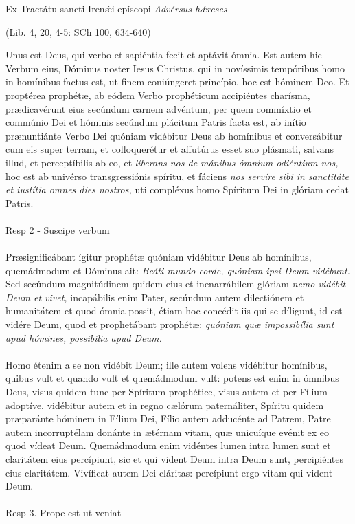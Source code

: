 \documentclass[options]{article}
\begin{document}
	Ex Tractátu sancti Iren\'{æ}i epíscopi \emph{Advérsus h\'{æ}reses}
	\begin{flushright}
			(Lib. 4, 20, 4-5: SCh 100, 634-640)
	\end{flushright}
Unus est Deus, qui verbo et sapiéntia fecit et aptávit ómnia.
Est autem hic Verbum eius, Dóminus noster Iesus Christus, qui in novíssimis tempóribus homo in homínibus factus est, ut finem coniúngeret princípio, hoc est hóminem Deo.
Et proptérea prophétæ, ab eódem Verbo prophéticum accipiéntes charísma, prædicavérunt eius secúndum carnem advéntum, per quem commíxtio et commúnio Dei et hóminis secúndum plácitum Patris facta est, ab inítio prænuntiánte Verbo Dei quóniam vidébitur Deus ab homínibus et conversábitur cum eis super terram, et colloquerétur et affutúrus esset suo plásmati, salvans illud, et perceptíbilis ab eo, et \emph{líberans nos de mánibus ómnium odiéntium nos,} hoc est ab univérso transgressiónis spíritu, et fáciens \emph{nos servíre sibi in sanctitáte et iustítia omnes dies nostros,} uti compléxus homo Spíritum Dei in glóriam cedat Patris.\\
\\
Resp 2 - Suscipe verbum\\
\\
Præsignificábant ígitur prophétæ quóniam vidébitur Deus ab homínibus, quemádmodum et Dóminus ait: \emph{Beáti mundo corde, quóniam ipsi Deum vidébunt.}\\
Sed secúndum magnitúdinem quidem eius et inenarrábilem glóriam \emph{nemo vidébit Deum et vivet,} incapábilis enim Pater, secúndum autem dilectiónem et humanitátem et quod ómnia possit, étiam hoc concédit iis qui se díligunt, id est vidére Deum, quod et prophetábant prophétæ: \emph{quóniam quæ impossibília sunt apud hómines, possibília apud Deum.}\\
\\
Homo étenim a se non vidébit Deum; ille autem volens vidébitur homínibus, quibus vult et quando vult et quemádmodum vult: potens est enim in ómnibus Deus, visus quidem tunc per Spíritum prophétice, visus autem et per Fílium adoptíve, vidébitur autem et in regno cælórum paternáliter, Spíritu quidem præparánte hóminem in Fílium Dei, Fílio autem adducénte ad Patrem, Patre autem incorruptélam donánte in ætérnam vitam, quæ unicuíque evénit ex eo quod vídeat Deum.
Quemádmodum enim vidéntes lumen intra lumen sunt et claritátem eius percípiunt, sic et qui vident Deum intra Deum sunt, percipiéntes eius claritátem. Vivíficat autem Dei cláritas: percípiunt ergo vitam qui vident Deum. \\
\\
Resp 3. Prope est ut veniat
\end{document}
